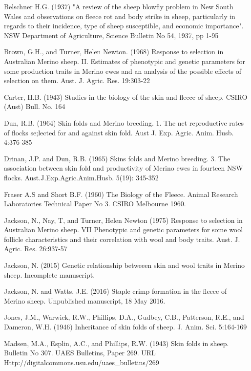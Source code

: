 \documentclass[titlepage]{article}  %
\begin{document}
\begin{thebibliography}{99}

Belschner H.G. (1937) "A review of the sheep blowfly problem in New South Wales and observations on fleece rot and body strike in sheep, particularly in regards to their incidence, type of sheep susceptible, and economic importance". NSW Department of Agriculture, Science Bulletin No 54, 1937, pp 1-95

Brown, G.H., and Turner, Helen Newton. (1968) Response to selection in Australian Merino sheep. II. Estimates of phenotypic and genetic parameters for some production traits in Merino ewes and an analysis of the possible effects of selection on them. Aust. J. Agric. Res. 19:303-22

Carter, H.B. (1943) Studies in the biology of the skin and fleece of sheep. CSIRO (Aust) Bull. No. 164
 
Dun, R.B. (1964) Skin folds and Merino breeding. 1. The net reproductive rates of flocks se;lected for and against skin fold. Aust J. Exp. Agric. Anim. Husb. 4:376-385

Drinan, J.P. and Dun, R.B. (1965) Skins folds and Merino breeding. 3. The association between skin fold and productivity of Merino ewes in fourteen NSW flocks. Aust.J.Exp.Agric.Anim.Husb. 5(19): 345-352

Fraser A.S and Short B.F. (1960) The Biology of the Fleece. Animal Research Laboratories Technical Paper No 3. CSIRO Melbourne 1960.

Jackson, N., Nay, T, and Turner, Helen Newton (1975) Response to selection in Australian Merino sheep. VII Phenotypic and genetic parameters for some wool follicle characteristics and their correlation with wool and body traits. Aust. J. Agric. Res. 26:937-57

Jackson, N. (2015) Genetic relationship betweeen skin and wool traits in Merino sheep. Incomplete manuscript.

Jackson, N. and Watts, J.E. (2016) Staple crimp formation in the fleece of Merino sheep. Unpublished manuscript, 18 May 2016.

Jones, J.M., Warwick, R.W., Phillips, D.A., Gudbey, C.B., Patterson, R.E., and Dameron, W.H. (1946) Inheritance of skin folds of sheep. J. Anim. Sci. 5:164-169

Madsen, M.A., Esplin, A.C., and Phillips, R.W. (1943) Skin folds in sheep. Bulletin No 307. UAES Bulletins, Paper 269. URL Http://digitalcommons.usu.edu/uaes\_bulletins/269


\end{thebibliography}
\end{document}
